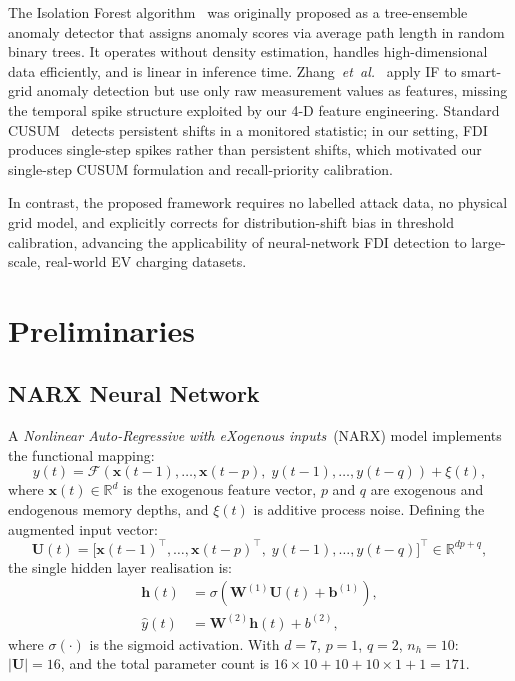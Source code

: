\documentclass[journal]{IEEEtran}
\begin{document}
The Isolation Forest algorithm~\cite{liu2008isolation} was
originally proposed as a tree-ensemble anomaly detector that
assigns anomaly scores via average path length in random binary
trees.
It operates without density estimation, handles high-dimensional
data efficiently, and is linear in inference time.
Zhang~\emph{et~al.}~\cite{zhang2019false} apply IF to smart-grid
anomaly detection but use only raw measurement values as features,
missing the temporal spike structure exploited by our 4-D feature
engineering.
Standard CUSUM~\cite{he2020cyber} detects persistent shifts in a
monitored statistic; in our setting, FDI produces single-step
spikes rather than persistent shifts, which motivated our
single-step CUSUM formulation and recall-priority calibration.

In contrast, the proposed framework requires no labelled attack
data, no physical grid model, and explicitly corrects for
distribution-shift bias in threshold calibration, advancing the
applicability of neural-network FDI detection to large-scale,
real-world EV charging datasets.

\section{Preliminaries}
\label{sec:prelim}

\subsection{NARX Neural Network}

A \emph{Nonlinear Auto-Regressive with eXogenous inputs}~(NARX)
model implements the functional mapping:
\begin{equation}
  y(t) = \mathcal{F}\!\left(
    \mathbf{x}(t{-}1),\ldots,\mathbf{x}(t{-}p),\;
    y(t{-}1),\ldots,y(t{-}q)
  \right) + \xi(t),
  \label{eq:narx}
\end{equation}
where $\mathbf{x}(t)\in\mathbb{R}^d$ is the exogenous feature
vector, $p$ and $q$ are exogenous and endogenous memory depths,
and $\xi(t)$ is additive process noise.
Defining the augmented input vector:
\begin{equation}
  \mathbf{U}(t) = \bigl[
    \mathbf{x}(t{-}1)^\top,\ldots,\mathbf{x}(t{-}p)^\top,\;
    y(t{-}1),\ldots,y(t{-}q)
  \bigr]^\top \in \mathbb{R}^{dp+q},
  \label{eq:input}
\end{equation}
the single hidden layer realisation is:
\begin{align}
  \mathbf{h}(t) &= \sigma\!\left(
      \mathbf{W}^{(1)}\mathbf{U}(t) + \mathbf{b}^{(1)}
    \right),
  \label{eq:hidden} \\
  \hat{y}(t)    &= \mathbf{W}^{(2)}\mathbf{h}(t) + b^{(2)},
  \label{eq:output}
\end{align}
where $\sigma(\cdot)$ is the sigmoid activation.
With $d=7$, $p=1$, $q=2$, $n_h=10$: $|\mathbf{U}|=16$,
and the total parameter count is
$16\!\times\!10 + 10 + 10\!\times\!1 + 1 = 171$.
\end{document}

